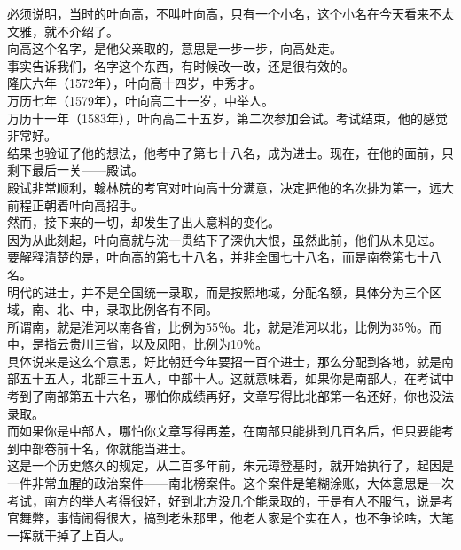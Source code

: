 \begin{multicols}{\theparacolNo}
必须说明，当时的叶向高，不叫叶向高，只有一个小名，这个小名在今天看来不太文雅，就不介绍了。\\

向高这个名字，是他父亲取的，意思是一步一步，向高处走。\\

事实告诉我们，名字这个东西，有时候改一改，还是很有效的。\\

隆庆六年（1572年），叶向高十四岁，中秀才。\\

万历七年（1579年），叶向高二十一岁，中举人。\\

万历十一年（1583年），叶向高二十五岁，第二次参加会试。考试结束，他的感觉非常好。\\

结果也验证了他的想法，他考中了第七十八名，成为进士。现在，在他的面前，只剩下最后一关——殿试。\\

殿试非常顺利，翰林院的考官对叶向高十分满意，决定把他的名次排为第一，远大前程正朝着叶向高招手。\\

然而，接下来的一切，却发生了出人意料的变化。\\

因为从此刻起，叶向高就与沈一贯结下了深仇大恨，虽然此前，他们从未见过。\\

要解释清楚的是，叶向高的第七十八名，并非全国七十八名，而是南卷第七十八名。\\

明代的进士，并不是全国统一录取，而是按照地域，分配名额，具体分为三个区域，南、北、中，录取比例各有不同。\\

所谓南，就是淮河以南各省，比例为55％。北，就是淮河以北，比例为35％。而中，是指云贵川三省，以及凤阳，比例为10％。\\

具体说来是这么个意思，好比朝廷今年要招一百个进士，那么分配到各地，就是南部五十五人，北部三十五人，中部十人。这就意味着，如果你是南部人，在考试中考到了南部第五十六名，哪怕你成绩再好，文章写得比北部第一名还好，你也没法录取。\\

而如果你是中部人，哪怕你文章写得再差，在南部只能排到几百名后，但只要能考到中部卷前十名，你就能当进士。\\

这是一个历史悠久的规定，从二百多年前，朱元璋登基时，就开始执行了，起因是一件非常血腥的政治案件——南北榜案件。这个案件是笔糊涂账，大体意思是一次考试，南方的举人考得很好，好到北方没几个能录取的，于是有人不服气，说是考官舞弊，事情闹得很大，搞到老朱那里，他老人家是个实在人，也不争论啥，大笔一挥就干掉了上百人。\\


\end{multicols}
